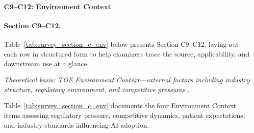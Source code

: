 \noindent\textbf{C9--C12: Environment Context}
\paragraph{Section C9--C12.}
\noindent Table~\ref{tab:survey_section_c_env} below presents Section C9--C12, laying out each row in structured form to help examiners trace the source, applicability, and downstream use at a glance. %


\noindent\textit{Theoretical basis: TOE Environment Context---external factors including industry structure, regulatory environment, and competitive pressures \cite{tornatzky1990processes}.}

\noindent Table~\ref{tab:survey_section_c_env} documents the four Environment Context items assessing regulatory pressure, competitive dynamics, patient expectations, and industry standards influencing AI adoption.

